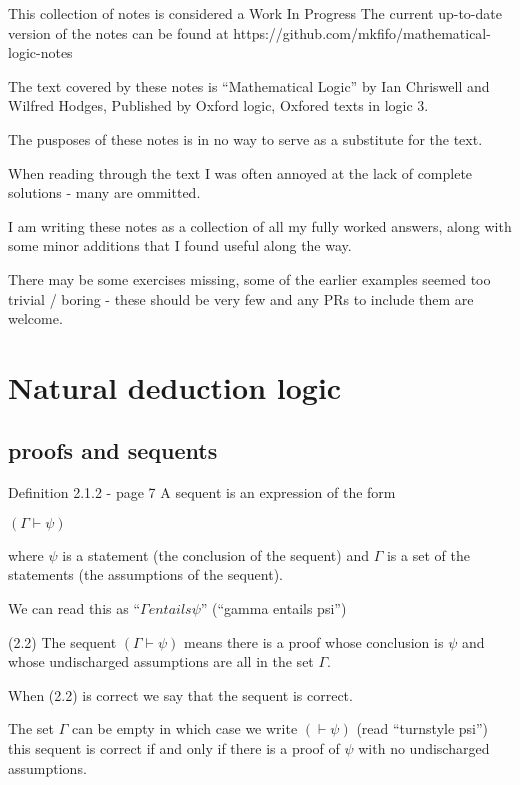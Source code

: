 \documentclass[a4paper, titlepage]{report}
\begin{document}
This collection of notes is considered a Work In Progress
The current up-to-date version of the notes can be found at https://github.com/mkfifo/mathematical-logic-notes


The text covered by these notes is ``Mathematical Logic'' by Ian Chriswell and Wilfred Hodges,
Published by Oxford logic, Oxfored texts in logic 3.

The pusposes of these notes is in no way to serve as a substitute for the text.

When reading through the text I was often annoyed at the lack of complete solutions - many are ommitted.


I am writing these notes as a collection of all my fully worked answers, along with some minor additions that I found useful
along the way.

There may be some exercises missing, some of the earlier examples seemed too trivial / boring - these should be very few
and any PRs to include them are welcome.


\chapter{Natural deduction logic}

\section{proofs and sequents}

Definition 2.1.2 - page 7
  A sequent is an expression of the form

  $(\Gamma \vdash \psi)$

  where $\psi$ is a statement (the conclusion of the sequent) and $\Gamma$ is a set of the statements (the assumptions of the sequent).

  We can read this as  ``$\Gamma entails \psi$'' (``gamma entails psi'')

(2.2) The sequent $(\Gamma \vdash \psi)$ means
  there is a proof whose conclusion is $\psi$ and whose undischarged assumptions are all in the set $\Gamma$.

When (2.2) is correct we say that the sequent is correct.

The set $\Gamma$ can be empty in which case we write $(\vdash \psi)$ (read ``turnstyle psi'')
this sequent is correct if and only if there is a proof of $\psi$ with no undischarged assumptions.

\bigskip

  
\end{document}

